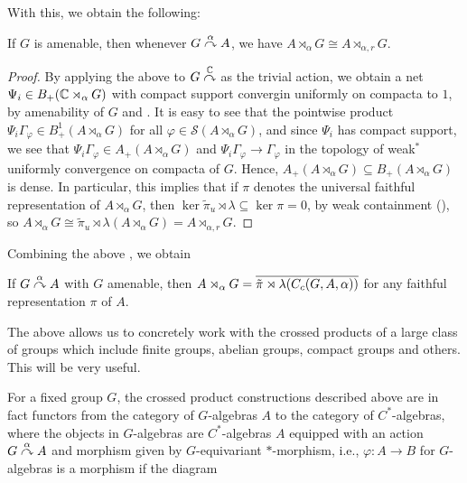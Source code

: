 With this, we obtain the following:
\begin{theorem}
	If $G$ is amenable, then whenever $G \stackrel{\alpha}{\curvearrowright} A$, we have $A \rtimes_\alpha G \cong A \rtimes_{\alpha,r}G$.
	\label{cross:amenable}
\end{theorem}
\begin{proof}
	By applying the above to $G \stackrel{\mathbb{C}}{\curvearrowright}$ as the trivial action, we obtain a net $\Psi_i \in B_{+}(\mathbb{C} \rtimes_\alpha G)$ with compact support convergin uniformly on compacta to $1$, by amenability of $G$ and \cite[Lemma 7.2.4]{pedersenalgauto}. It is easy to see that the pointwise product $\Psi_i \Gamma_\varphi \in B_+^1(A \rtimes_\alpha G)$ for all $\varphi \in \mathcal{S}(A \rtimes_\alpha G)$, and since $\Psi_i$ has compact support, we see that $\Psi_i \Gamma_\varphi \in A_+(A \rtimes_\alpha G)$ and $\Psi_i \Gamma_\varphi \to \Gamma_\varphi$ in the topology of weak$^*$ uniformly convergence on compacta of $G$. Hence, $A_+(A \rtimes_\alpha G) \subseteq B_+(A \rtimes_\alpha G)$ is dense. In particular, this implies that if $\pi$ denotes the universal faithful representation of $A \rtimes_\alpha G$, then $\ker \tilde \pi_u \rtimes \lambda \subseteq \ker \pi = 0$, by weak containment (\cite[80]{dixmier1969c}), so $A \rtimes_\alpha G \cong \tilde \pi_u \rtimes \lambda( A \rtimes_\alpha G) = A \rtimes_{\alpha,r}G$.
\end{proof}
Combining the above , we obtain
\begin{corollary}
	If $G \stackrel{\alpha}{\curvearrowright} A$ with $G$ amenable, then $A \rtimes_\alpha G = \overline{\tilde \pi \rtimes \lambda (C_c(G,A,\alpha))}$ for any faithful representation $\pi$ of $A$.
\end{corollary}
The above allows us to concretely work with the crossed products of a large class of groups which include finite groups, abelian groups, compact groups and others. This will be very useful.

For a fixed group $G$, the crossed product constructions described above are in fact functors from the category of $G$-algebras $A$ to the category of $C^*$-algebras, where the objects in $G$-algebras are $C^*$-algebras $A$ equipped with an action $G \stackrel{\alpha}{\curvearrowright} A$ and morphism given by $G$-equivariant $*$-morphism, i.e., $\varphi \colon A \to B$ for $G$-algebras is a morphism if the diagram

